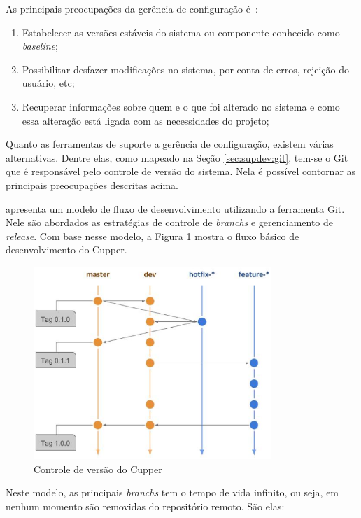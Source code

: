 As principais preocupações da gerência de configuração é~\cite{pressman:2009}:
\begin{enumerate}
  \item Estabelecer as versões estáveis do sistema ou componente conhecido
    como \textit{baseline};
  \item Possibilitar desfazer modificações no sistema, por conta de erros,
    rejeição do usuário, etc;
  \item Recuperar informações sobre quem e o que foi alterado no sistema e como
    essa alteração está ligada com as necessidades do projeto;
\end{enumerate}

Quanto as ferramentas de suporte a gerência de configuração, existem várias alternativas.
Dentre elas, como mapeado na Seção \ref{sec:supdev:git}, tem-se o Git que é responsável pelo
controle de versão do sistema. Nela é possível contornar as principais preocupações
descritas acima.

 apresenta um modelo de fluxo de desenvolvimento utilizando a
ferramenta Git. Nele são abordados as estratégias de controle de \textit{branchs} e
gerenciamento de \textit{release}. Com base nesse modelo, a Figura \ref{fig:ctrl_versao}
mostra o fluxo básico de desenvolvimento do Cupper.

\begin{figure}[H]
  \centering
  \label{fig:ctrl_versao}
  \includegraphics[width=0.8\textwidth]{figuras/controle_versao}
  \caption{Controle de versão do Cupper}
\end{figure}

Neste modelo, as principais \textit{branchs} tem o tempo de vida infinito, ou seja,
em nenhum momento são removidas do repositório remoto. São elas:

